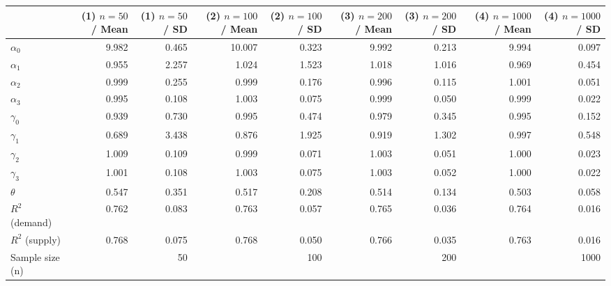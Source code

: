 
\begin{tabular}[t]{lrrrrrrrr}
\toprule
  & (1) $n=50$ / Mean & (1) $n=50$ / SD & (2) $n=100$ / Mean & (2) $n=100$ / SD & (3) $n=200$ / Mean & (3) $n=200$ / SD & (4) $n=1000$ / Mean & (4) $n=1000$ / SD\\
\midrule
$\alpha_{0}$ & 9.982 & 0.465 & 10.007 & 0.323 & 9.992 & 0.213 & 9.994 & 0.097\\
$\alpha_{1}$ & 0.955 & 2.257 & 1.024 & 1.523 & 1.018 & 1.016 & 0.969 & 0.454\\
$\alpha_{2}$ & 0.999 & 0.255 & 0.999 & 0.176 & 0.996 & 0.115 & 1.001 & 0.051\\
$\alpha_{3}$ & 0.995 & 0.108 & 1.003 & 0.075 & 0.999 & 0.050 & 0.999 & 0.022\\
$\gamma_{0}$ & 0.939 & 0.730 & 0.995 & 0.474 & 0.979 & 0.345 & 0.995 & 0.152\\
$\gamma_{1}$ & 0.689 & 3.438 & 0.876 & 1.925 & 0.919 & 1.302 & 0.997 & 0.548\\
$\gamma_{2}$ & 1.009 & 0.109 & 0.999 & 0.071 & 1.003 & 0.051 & 1.000 & 0.023\\
$\gamma_{3}$ & 1.001 & 0.108 & 1.003 & 0.075 & 1.003 & 0.052 & 1.000 & 0.022\\
$\theta$ & 0.547 & 0.351 & 0.517 & 0.208 & 0.514 & 0.134 & 0.503 & 0.058\\
$R^{2}$ (demand) & 0.762 & 0.083 & 0.763 & 0.057 & 0.765 & 0.036 & 0.764 & 0.016\\
$R^{2}$ (supply) & 0.768 & 0.075 & 0.768 & 0.050 & 0.766 & 0.035 & 0.763 & 0.016\\
Sample size (n) &  & 50 &  & 100 &  & 200 &  & 1000\\
\bottomrule
\end{tabular}
